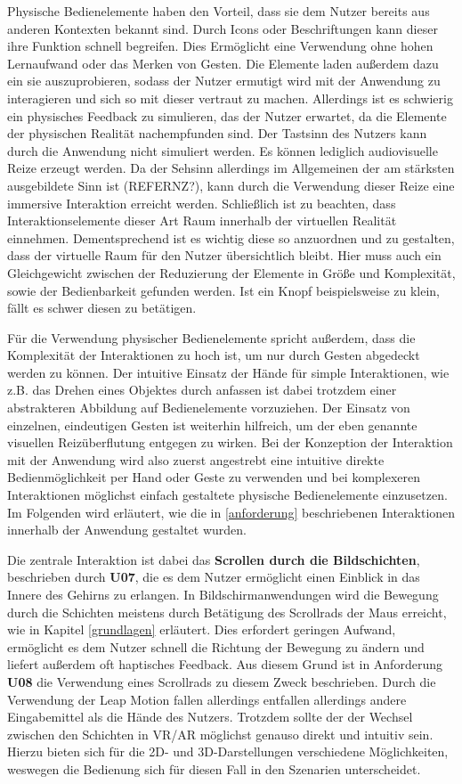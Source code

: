 Physische Bedienelemente haben den Vorteil, dass sie dem Nutzer bereits aus anderen Kontexten bekannt sind. Durch Icons oder Beschriftungen kann dieser ihre Funktion schnell begreifen. 
 Dies Ermöglicht eine Verwendung ohne hohen Lernaufwand oder das Merken von Gesten. 
Die Elemente laden außerdem dazu ein sie auszuprobieren, sodass der Nutzer ermutigt wird mit der Anwendung zu interagieren und sich so mit dieser vertraut zu machen. 
Allerdings ist es schwierig ein physisches Feedback zu simulieren, das der Nutzer erwartet, da die Elemente der physischen Realität nachempfunden sind. Der Tastsinn des Nutzers kann durch die Anwendung nicht simuliert werden. Es können lediglich audiovisuelle Reize erzeugt werden. Da der Sehsinn allerdings im Allgemeinen der am stärksten ausgebildete Sinn ist (REFERNZ?), kann durch die Verwendung dieser Reize eine immersive Interaktion erreicht werden. 
Schließlich ist zu beachten, dass Interaktionselemente dieser Art Raum innerhalb der virtuellen Realität einnehmen. Dementsprechend ist es wichtig diese so anzuordnen und zu gestalten, dass der virtuelle Raum für den Nutzer übersichtlich bleibt. Hier muss auch ein Gleichgewicht zwischen der Reduzierung der Elemente in Größe und Komplexität, sowie der Bedienbarkeit gefunden werden. Ist ein Knopf beispielsweise zu klein, fällt es schwer diesen zu betätigen. 

Für die Verwendung physischer Bedienelemente spricht außerdem, dass die Komplexität der Interaktionen zu hoch ist, um nur durch Gesten abgedeckt werden zu können. Der intuitive Einsatz der Hände für simple Interaktionen, wie z.B. das Drehen eines Objektes durch anfassen ist dabei trotzdem einer abstrakteren Abbildung auf Bedienelemente vorzuziehen. Der Einsatz von einzelnen, eindeutigen Gesten ist weiterhin hilfreich, um der eben genannte visuellen Reizüberflutung entgegen zu wirken. 
Bei der Konzeption der Interaktion mit der Anwendung wird also zuerst angestrebt eine intuitive direkte Bedienmöglichkeit per Hand oder Geste zu verwenden und bei komplexeren Interaktionen möglichst einfach gestaltete physische Bedienelemente einzusetzen.
Im Folgenden wird erläutert, wie die in \ref{anforderung} beschriebenen Interaktionen innerhalb der Anwendung gestaltet wurden.

Die zentrale Interaktion ist dabei das \textbf{Scrollen durch die Bildschichten}, beschrieben durch \textbf{U07}, die es dem Nutzer ermöglicht einen Einblick in das Innere des Gehirns zu erlangen. In Bildschirmanwendungen wird die Bewegung durch die Schichten meistens durch Betätigung des Scrollrads der Maus erreicht, wie in Kapitel \ref{grundlagen} erläutert.
Dies erfordert geringen Aufwand, ermöglicht es dem Nutzer schnell die Richtung der Bewegung zu ändern und liefert außerdem oft haptisches Feedback. 
Aus diesem Grund ist in Anforderung \textbf{U08} die Verwendung eines Scrollrads zu diesem Zweck beschrieben. Durch die Verwendung der Leap Motion fallen allerdings entfallen allerdings andere Eingabemittel als die Hände des Nutzers.
Trotzdem sollte der der Wechsel zwischen den Schichten in VR/AR möglichst genauso direkt und intuitiv sein. 
Hierzu bieten sich für die 2D- und 3D-Darstellungen verschiedene Möglichkeiten, weswegen die Bedienung sich für diesen Fall in den Szenarien unterscheidet. 

